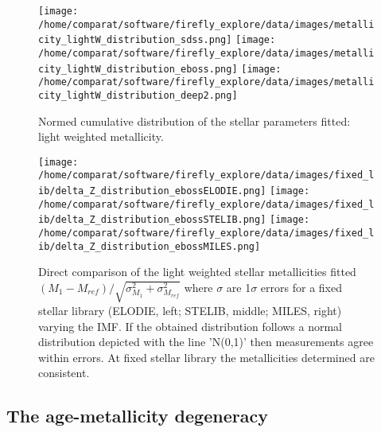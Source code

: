 \documentclass[onecolumn]{aa}
\begin{document}
\begin{figure}
\begin{center}
\caption{\label{fig:distributions:LwZ} 
Normed cumulative distribution of the stellar parameters fitted: light weighted metallicity.}  
\texttt{[image: /home/comparat/software/firefly\_explore/data/images/metallicity\_lightW\_distribution\_sdss.png]}
\texttt{[image: /home/comparat/software/firefly\_explore/data/images/metallicity\_lightW\_distribution\_eboss.png]}
\texttt{[image: /home/comparat/software/firefly\_explore/data/images/metallicity\_lightW\_distribution\_deep2.png]}
\end{center}
\end{figure}

\begin{figure}
\begin{center}
\caption{\label{fig:comparison:imfs:Z} 
Direct comparison of the light weighted stellar metallicities fitted $(M_1-M_{ref})/\sqrt{\sigma^2_{M_1}+\sigma^2_{M_{ref}}}$ where $\sigma$ are 1$\sigma$ errors for a fixed stellar library (ELODIE, left; STELIB, middle; MILES, right) varying the IMF. 
If the obtained distribution follows a normal distribution depicted with the line 'N(0,1)' then measurements agree within errors. 
At fixed stellar library the metallicities determined are consistent.}
\texttt{[image: /home/comparat/software/firefly\_explore/data/images/fixed\_lib/delta\_Z\_distribution\_ebossELODIE.png]}
\texttt{[image: /home/comparat/software/firefly\_explore/data/images/fixed\_lib/delta\_Z\_distribution\_ebossSTELIB.png]}
\texttt{[image: /home/comparat/software/firefly\_explore/data/images/fixed\_lib/delta\_Z\_distribution\_ebossMILES.png]}
\end{center}
\end{figure}

\subsection{The age-metallicity degeneracy}
\end{document}
